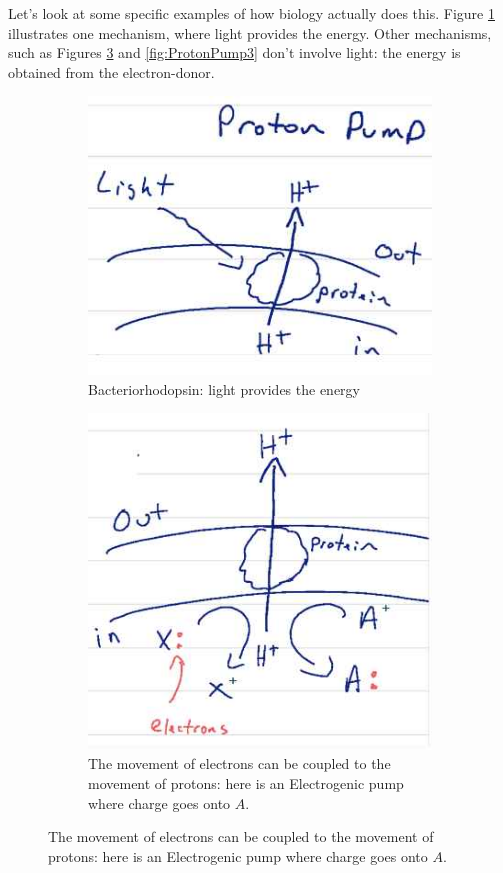 \documentclass[]{article}
\begin{document}
Let's look at some specific examples of how biology actually does this. Figure \ref{fig:ProtonPump1} illustrates one mechanism, where light provides the energy. Other mechanisms, such as Figures \ref{fig:ProtonPump2} and \ref{fig:ProtonPump3} don't involve light: the energy is obtained from the electron-donor.


\begin{figure}[H]
	\caption{Mechanisms for pumping electrons}
	\begin{subfigure}[t]{0.3\textwidth}
		\caption{Bacteriorhodopsin: light provides the energy}\label{fig:ProtonPump1}
		\includegraphics[width=\textwidth]{ProtonPump1}
	\end{subfigure}
	\begin{subfigure}[t]{0.3\textwidth}
		\caption{The movement of electrons can be coupled to the movement of protons: here is an Electrogenic pump where charge goes onto $A$.}\label{fig:ProtonPump2}
		\includegraphics[width=\textwidth]{ProtonPump2}

\end{subfigure}
\end{figure}
\end{document}
